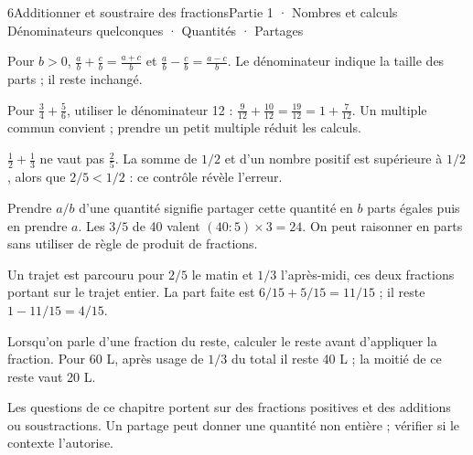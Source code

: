\begin{ouverture}[calcul]{6}{Additionner et soustraire des fractions}{Partie 1 · Nombres et calculs}
{Dénominateurs quelconques · Quantités · Partages}
\end{ouverture}
\pagestyle{otMain}\essentiel\fontsize{11}{15}\selectfont
{}\label{cours-6-1}
\begin{propriete}Pour $b>0$, $\frac ab+\frac cb=\frac{a+c}b$ et $\frac ab-\frac cb=\frac{a-c}b$. Le dénominateur indique la taille des parts ; il reste inchangé.\end{propriete}
\label{fig-cours-6-1-cours-somme-fractions}

\begin{savoirfaire}Pour $\frac34+\frac56$, utiliser le dénominateur 12 : $\frac9{12}+\frac{10}{12}=\frac{19}{12}=1+\frac7{12}$. Un multiple commun convient ; prendre un petit multiple réduit les calculs.\end{savoirfaire}
\begin{attention}$\frac12+\frac13$ ne vaut pas $\frac25$. La somme de $1/2$ et d’un nombre positif est supérieure à $1/2$, alors que $2/5<1/2$ : ce contrôle révèle l’erreur.\end{attention}
\clearpage
{}\label{cours-6-2}
\begin{savoirfaire}Prendre $a/b$ d’une quantité signifie partager cette quantité en $b$ parts égales puis en prendre $a$. Les $3/5$ de 40 valent $(40:5)\times3=24$. On peut raisonner en parts sans utiliser de règle de produit de fractions.\end{savoirfaire}
\begin{exemple}Un trajet est parcouru pour $2/5$ le matin et $1/3$ l’après-midi, ces deux fractions portant sur le trajet entier. La part faite est $6/15+5/15=11/15$ ; il reste $1-11/15=4/15$.\end{exemple}
\begin{savoirfaire}Lorsqu’on parle d’une fraction du reste, calculer le reste avant d’appliquer la fraction. Pour 60 L, après usage de $1/3$ du total il reste 40 L ; la moitié de ce reste vaut 20 L.\end{savoirfaire}
\begin{attention}Les questions de ce chapitre portent sur des fractions positives et des additions ou soustractions. Un partage peut donner une quantité non entière ; vérifier si le contexte l’autorise.\end{attention}

